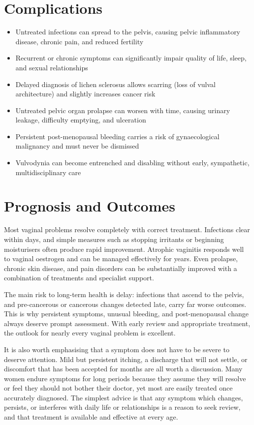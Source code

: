 \section*{Complications}
\begin{itemize}
    \item Untreated infections can spread to the pelvis, causing pelvic inflammatory disease, chronic pain, and reduced fertility
    \item Recurrent or chronic symptoms can significantly impair quality of life, sleep, and sexual relationships
    \item Delayed diagnosis of lichen sclerosus allows scarring (loss of vulval architecture) and slightly increases cancer risk
    \item Untreated pelvic organ prolapse can worsen with time, causing urinary leakage, difficulty emptying, and ulceration
    \item Persistent post-menopausal bleeding carries a risk of gynaecological malignancy and must never be dismissed
    \item Vulvodynia can become entrenched and disabling without early, sympathetic, multidisciplinary care
\end{itemize}

\section*{Prognosis and Outcomes}
Most vaginal problems resolve completely with correct treatment. Infections clear within days, and simple measures such as stopping irritants or beginning moisturisers often produce rapid improvement. Atrophic vaginitis responds well to vaginal oestrogen and can be managed effectively for years. Even prolapse, chronic skin disease, and pain disorders can be substantially improved with a combination of treatments and specialist support.

The main risk to long-term health is delay: infections that ascend to the pelvis, and pre-cancerous or cancerous changes detected late, carry far worse outcomes. This is why persistent symptoms, unusual bleeding, and post-menopausal change always deserve prompt assessment. With early review and appropriate treatment, the outlook for nearly every vaginal problem is excellent.

It is also worth emphasising that a symptom does not have to be severe to deserve attention. Mild but persistent itching, a discharge that will not settle, or discomfort that has been accepted for months are all worth a discussion. Many women endure symptoms for long periods because they assume they will resolve or feel they should not bother their doctor, yet most are easily treated once accurately diagnosed. The simplest advice is that any symptom which changes, persists, or interferes with daily life or relationships is a reason to seek review, and that treatment is available and effective at every age.

